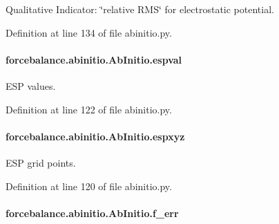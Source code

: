 Qualitative Indicator\-: \char`\"{}relative R\-M\-S\char`\"{} for electrostatic potential. 



Definition at line 134 of file abinitio.\-py.

\hypertarget{classforcebalance_1_1abinitio_1_1AbInitio_aba6d885086d455fce8c3d472fd08020d}{
\paragraph[{espval}]{\setlength{\rightskip}{0pt plus 5cm}forcebalance.\-abinitio.\-Ab\-Initio.\-espval\hspace{0.3cm}{\ttfamily [inherited]}}}\label{classforcebalance_1_1abinitio_1_1AbInitio_aba6d885086d455fce8c3d472fd08020d}


E\-S\-P values. 



Definition at line 122 of file abinitio.\-py.

\hypertarget{classforcebalance_1_1abinitio_1_1AbInitio_a8be2d088afb344036aae989ca3cbcc41}{
\paragraph[{espxyz}]{\setlength{\rightskip}{0pt plus 5cm}forcebalance.\-abinitio.\-Ab\-Initio.\-espxyz\hspace{0.3cm}{\ttfamily [inherited]}}}\label{classforcebalance_1_1abinitio_1_1AbInitio_a8be2d088afb344036aae989ca3cbcc41}


E\-S\-P grid points. 



Definition at line 120 of file abinitio.\-py.

\hypertarget{classforcebalance_1_1abinitio_1_1AbInitio_a176fb2b013ecc5ab451fd3b190414c4d}{
\paragraph[{f\-\_\-err}]{\setlength{\rightskip}{0pt plus 5cm}forcebalance.\-abinitio.\-Ab\-Initio.\-f\-\_\-err\hspace{0.3cm}{\ttfamily [inherited]}}}\label{classforcebalance_1_1abinitio_1_1AbInitio_a176fb2b013ecc5ab451fd3b190414c4d}


